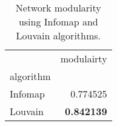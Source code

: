 \begin{table}[!htbp]
\centering
\caption{Network modularity using Infomap and Louvain algorithms.}
\label{tab:modularity}
\begin{tabular}{lr}
\toprule
 & modulairty \\
algorithm &  \\
\midrule
Infomap & 0.774525 \\
Louvain & \textbf{0.842139} \\
\bottomrule
\end{tabular}
\end{table}
